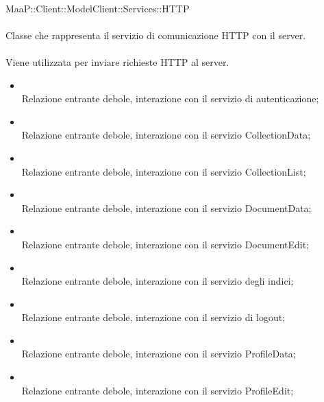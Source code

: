 \\
MaaP::Client::ModelClient::Services::HTTP\\
\\
Classe che rappresenta il servizio di comunicazione HTTP con il server.\\
\\
Viene utilizzata per inviare richieste HTTP al server.\\
\begin{itemize}
\item{}\\
Relazione entrante debole, interazione con il servizio di autenticazione;
\item{}\\
Relazione entrante debole, interazione con il servizio CollectionData;
\item{}\\
Relazione entrante debole, interazione con il servizio CollectionList;
\item{}\\
Relazione entrante debole, interazione con il servizio DocumentData;
\item{}\\
Relazione entrante debole, interazione con il servizio DocumentEdit;
\item{}\\
Relazione entrante debole, interazione con il servizio degli indici;
\item{}\\
Relazione entrante debole, interazione con il servizio di logout;
\item{}\\
Relazione entrante debole, interazione con il servizio ProfileData;
\item{}\\
Relazione entrante debole, interazione con il servizio ProfileEdit;

\end{itemize}
